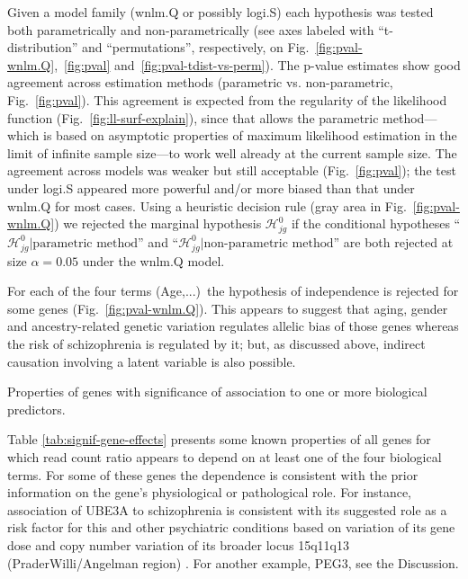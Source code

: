 \documentclass[12pt,letterpaper]{article}
\begin{document}
Given a model family (wnlm.Q or possibly logi.S) each hypothesis was tested
both parametrically and non-parametrically (see axes labeled with
``t-distribution'' and ``permutations'', respectively, on
Fig.~\ref{fig:pval-wnlm.Q},~\ref{fig:pval} and~\ref{fig:pval-tdist-vs-perm}).
The p-value estimates show good agreement across estimation methods
(parametric vs. non-parametric, Fig.~\ref{fig:pval}). This agreement is
expected from the regularity of the likelihood function
(Fig.~\ref{fig:ll-surf-explain}), since that allows the parametric
method---which is based on asymptotic properties of maximum likelihood
estimation in the limit of infinite sample size---to work well already at the
current sample size. The agreement across models was weaker but still
acceptable (Fig.~\ref{fig:pval}); the test under logi.S appeared more powerful
and/or more biased than that under wnlm.Q for most cases. Using a heuristic
decision rule (gray area in Fig.~\ref{fig:pval-wnlm.Q}) we rejected the
marginal hypothesis \(\mathcal{H}^0_{jg}\) if the conditional hypotheses
``\(\mathcal{H}^0_{jg} |\text{parametric method}\)'' and
``\(\mathcal{H}^0_{jg} |\text{non-parametric method}\)'' are both rejected at
size \(\alpha = 0.05\) under the wnlm.Q model.

For each of the four terms (Age,...)~the hypothesis of independence is
rejected for some genes (Fig.~\ref{fig:pval-wnlm.Q}). This appears to suggest
that aging, gender and ancestry-related genetic variation regulates allelic
bias of those genes whereas the risk of schizophrenia is regulated by it; but,
as discussed above, indirect causation involving a latent variable is also
possible.

\begin{table}
\footnotesize

\caption{
Properties of genes with significance of association to one or more biological predictors.
}
\label{tab:signif-gene-effects}
\end{table}

Table \ref{tab:signif-gene-effects} presents some known properties of all
genes for which read count ratio appears to depend on at least one of the four
biological terms. For some of these genes the dependence is consistent with
the prior information on the gene's physiological or pathological role.  For
instance, association of UBE3A to schizophrenia is consistent with its
suggested role as a risk factor for this and other psychiatric conditions
based on variation of its gene dose and copy number variation of its broader
locus 15q11q13 (PraderWilli/Angelman region) \cite{Sullivan2012,
McNamara2013}.  For another example, PEG3, see the Discussion.
\end{document}
